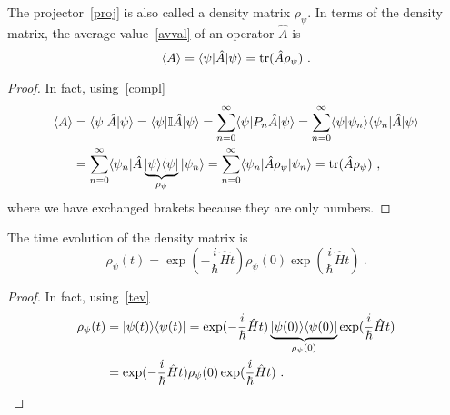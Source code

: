     The projector~\eqref{proj} is also called a density matrix $\rho_\psi$. In terms of the density matrix, the average value~\eqref{avval} of an operator $\hat A$ is 
    \begin{equation*}
        \langle A\rangle = \langle\psi\vert \hat A \vert\psi\rangle = \operatorname{tr} (\hat A \rho_\psi) ~.
    \end{equation*}
    \begin{proof}
        In fact, using~\eqref{compl}
        \begin{equation*}
        \begin{aligned}
            \langle A\rangle & = \langle\psi\vert \hat A \vert\psi\rangle = \langle\psi\vert \mathbb I \hat A \vert\psi\rangle = \sum_{n=0}^{\infty} \langle\psi\vert P_n \hat A \vert\psi\rangle = \sum_{n=0}^{\infty} \langle\psi\vert\psi_n\rangle \langle\psi_n\vert \hat A \vert\psi\rangle \\ & = \sum_{n=0}^{\infty} \langle\psi_n\vert \hat A \underbrace{\vert\psi\rangle \langle\psi\vert}_{\rho_\psi} \vert\psi_n\rangle = \sum_{n=0}^{\infty} \langle\psi_n\vert \hat A \rho_\psi \vert\psi_n\rangle = \operatorname{tr} (\hat A \rho_\psi) ~,
        \end{aligned}
        \end{equation*}
        where we have exchanged brakets because they are only numbers.
    \end{proof}
    The time evolution of the density matrix is 
    \begin{equation*}
        \rho_\psi (t) = \exp(- \frac{i}{\hbar} \hat H t) \rho_\psi (0) \exp(\frac{i}{\hbar} \hat H t) ~.
    \end{equation*}
    \begin{proof}
        In fact, using~\eqref{tev}
        \begin{equation*}
        \begin{aligned}
            \rho_\psi (t) & = \vert\psi(t)\rangle \langle\psi(t)\vert = \exp(- \frac{i}{\hbar} \hat H t) \underbrace{\vert\psi(0)\rangle \langle\psi(0)\vert}_{\rho_\psi (0)} \exp(\frac{i}{\hbar} \hat H t) \\ & = \exp(- \frac{i}{\hbar} \hat H t) \rho_\psi (0) \exp(\frac{i}{\hbar} \hat H t) ~.
        \end{aligned}
        \end{equation*}
    \end{proof}

